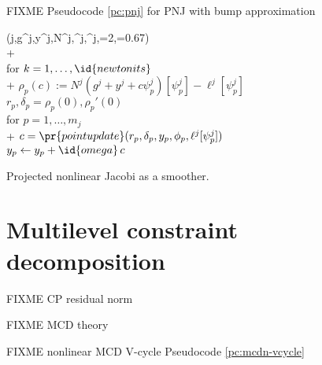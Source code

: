 \documentclass[letterpaper,final,12pt,reqno]{amsart}
\theoremstyle{claim}
\numberwithin{equation}{section}
\numberwithin{figure}{section}
\numberwithin{table}{section}
\numberwithin{theorem}{section}
\begin{document}
FIXME Pseudocode \ref{pc:pnj} for PNJ with bump approximation

\begin{pcode}[ht]
\begin{pseudo*}
(j,g^j,y^j,N^j,\ell^j,\phi^j,=2,=0.67)\text{:} \\+
     \\
    for $k=1,\dots,\id{newtonits}$ \\+
        $\rho_p(c) := N^j(g^j+y^j+c\psi_p^j)[\psi_p^j] - \ell^j[\psi_p^j]$ \\
        $r_p, \delta_p = \rho_p(0), \rho_p'(0)$ \qquad\qquad\qquad\qquad {}\\
        for $p=1,\dots,m_j$ \\+
            $c = \pr{pointupdate}(r_p, \delta_p,y_p,\phi_p,\ell^j[\psi_p^j])$ \\
            $y_p \gets y_p + \id{omega}\,c$
\end{pseudo*}
\caption{Projected nonlinear Jacobi as a smoother.}
\label{pc:pnj}
\end{pcode}


\section{Multilevel constraint decomposition} \label{sec:mcdstokes}

FIXME CP residual norm

FIXME MCD theory

FIXME nonlinear MCD V-cycle Pseudocode \ref{pc:mcdn-vcycle}
\end{document}
